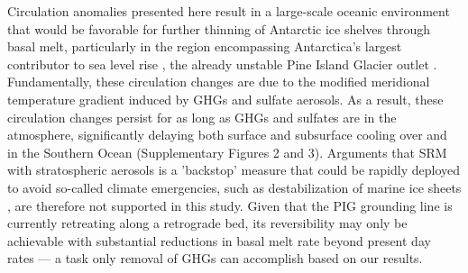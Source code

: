 \documentclass{nature}
\begin{document}
Circulation anomalies presented here result in a large-scale oceanic environment that would be favorable for further thinning of Antarctic ice shelves through basal melt, particularly in the region encompassing Antarctica's largest contributor to sea level rise \cite{shepherd12}, the already unstable Pine Island Glacier outlet \cite{rignot14}. Fundamentally, these circulation changes are due to the modified meridional temperature gradient induced by GHGs and sulfate aerosols. As a result, these circulation changes persist for as long as GHGs and sulfates are in the atmosphere, significantly delaying both surface and subsurface cooling over and in the Southern Ocean (Supplementary Figures 2 and 3). Arguments that SRM with stratospheric aerosols is a 'backstop' measure that could be rapidly deployed to avoid so-called climate emergencies, such as destabilization of marine ice sheets \cite{blackstock09}, are therefore not supported in this study. Given that the PIG grounding line is currently retreating along a retrograde bed, its reversibility may only be achievable with substantial reductions in basal melt rate beyond present day rates \cite{favier14} --- a task only removal of GHGs can accomplish based on our results.


\end{document}
